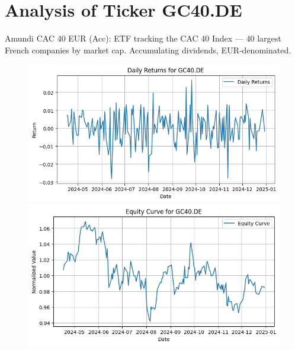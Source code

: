 \documentclass{article}%
\begin{document}
%
\newpage

%
\section*{Analysis of Ticker GC40.DE}%
\label{sec:AnalysisofTickerGC40.DE}%
Amundi CAC 40 EUR (Acc): ETF tracking the CAC 40 Index — 40 largest French companies by market cap. Accumulating dividends, EUR‑denominated.%


\begin{figure}[htbp]%
\begin{minipage}{0.49\textwidth}%
\includegraphics[width=\linewidth]{ticker_images/GC40.DE_daily_returns.png}%
\end{minipage}%
\begin{minipage}{0.49\textwidth}%
\includegraphics[width=\linewidth]{ticker_images/GC40.DE_equity_curve.png}%
\end{minipage}%
\end{figure}

%
\end{document}
